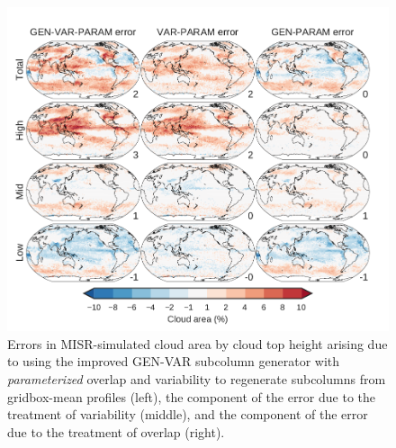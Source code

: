 \begin{figure}[htbp]
\centering
\includegraphics{graphics/subgrid2_cldmisr_maps_gen-var-param_diff.pdf}
\caption{\label{fig:subgrid2_cldmisr_maps_gen-var-param_diff}Errors in
MISR-simulated cloud area by cloud top height arising due to using the
improved GEN-VAR subcolumn generator with \emph{parameterized} overlap
and variability to regenerate subcolumns from gridbox-mean profiles
(left), the component of the error due to the treatment of variability
(middle), and the component of the error due to the treatment of overlap
(right).}\label{fig:subgrid2ux5fcldmisrux5fmapsux5fgen-var-paramux5fdiff}
\end{figure}

